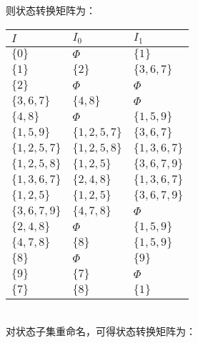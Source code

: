 \documentclass{article}
\begin{document}
则状态转换矩阵为：
\begin{table}[h]
    \centering
\begin{tabular}{|p{3cm}<{\centering}|p{3cm}<{\centering}|p{3cm}<{\centering}|}   
    \hline
    $I$ & $I_0$ & $I_1$ \\
    \hline
    $\{0\}$ & $\Phi$ & $\{1\}$ \\
    \hline
    $\{1\}$ & $\{2\}$ & $\{3,6,7\}$ \\
    \hline
    $\{2\}$ & $\Phi$ & $\Phi$ \\
    \hline
    $\{3,6,7\}$ & $\{4,8\}$ & $\Phi$ \\
    \hline
    $\{4,8\}$ & $\Phi$ & $\{1,5,9\}$ \\
    \hline
    $\{1,5,9\}$ & $\{1,2,5,7\}$ & $\{3,6,7\}$ \\
    \hline
    $\{1,2,5,7\}$ & $\{1,2,5,8\}$ & $\{1,3,6,7\}$ \\
    \hline
    $\{1,2,5,8\}$ & $\{1,2,5\}$ & $\{3,6,7,9\}$ \\
    \hline
    $\{1,3,6,7\}$ & $\{2,4,8\}$ & $\{1,3,6,7\}$ \\
    \hline
    $\{1,2,5\}$ & $\{1,2,5\}$ & $\{3,6,7,9\}$ \\
    \hline
    $\{3,6,7,9\}$ & $\{4,7,8\}$ & $\Phi$ \\
    \hline
    $\{2,4,8\}$ & $\Phi$ & $\{1,5,9\}$ \\
    \hline
    $\{4,7,8\}$ & $\{8\}$ & $\{1,5,9\}$ \\
    \hline
    $\{8\}$ & $\Phi$ & $\{9\}$ \\
    \hline
    $\{9\}$ & $\{7\}$ & $\Phi$ \\
    \hline
    $\{7\}$ & $\{8\}$ & $\{1\}$ \\
    \hline
\end{tabular}
\end{table}
\ \\
对状态子集重命名，可得状态转换矩阵为：
\end{document}
